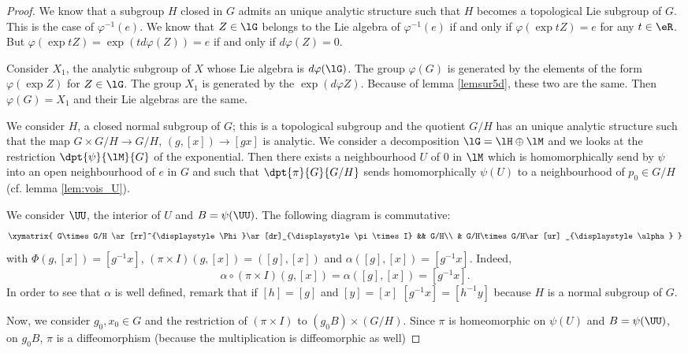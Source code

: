\begin{proof}
 We know that a subgroup $H$ closed in $G$ admits an unique analytic structure such that $H$ becomes a topological Lie subgroup of $G$. This is the case of $\varphi^{-1}(e)$. We know that $Z\in\lG$ belongs to the Lie algebra of $\varphi^{-1}(e)$ if and only if $\varphi(\exp tZ)=e$ for any $t\in\eR$. But $\varphi(\exp tZ)=\exp(td\varphi(Z))=e$ if and only if $d\varphi(Z)=0$.

Consider $X_1$, the analytic subgroup of $X$ whose Lie algebra is $d\varphi(\lG)$. The group $\varphi(G)$ is generated by the elements of the form $\varphi(\exp Z)$ for $Z\in\lG$. The group $X_1$ is generated by the $\exp(d\varphi Z)$. Because of lemma \ref{lemsur5d}, these two are the same. Then $\varphi(G)=X_1$ and their Lie algebras are the same.

We consider $H$, a closed normal subgroup of $G$; this is a topological subgroup and the quotient $G/H$ has an unique analytic structure such that the map $G\times G/H\to G/H$, $(g,[x])\to [gx]$ is analytic. We consider a decomposition $\lG=\lH\oplus\lM$ and we looks at the restriction $\dpt{\psi}{\lM}{G}$ of the exponential. Then there exists a neighbourhood $U$ of $0$ in $\lM$ which is homomorphically send by  $\psi$ into an open neighbourhood of $e$ in $G$ and such that $\dpt{\pi}{G}{G/H}$ sends homomorphically $\psi(U)$ to a neighbourhood  of $p_0\in G/H$ (cf. lemma \ref{lem:vois_U}).

We consider $\UU$, the interior of $U$ and $B=\psi(\UU)$. The following diagram is commutative:
\begin{equation}
 \xymatrix{
    G\times G/H  \ar[rr]^{\displaystyle\Phi}\ar[dr]_{\displaystyle \pi\times I} &&  G/H\\
     &     G/H\times G/H\ar[ur] _{\displaystyle\alpha}
  }
\end{equation}
with $\Phi(g,[x])=[g^{-1} x]$, $(\pi\times I)(g,[x])=([g],[x])$ and $\alpha([g],[x])=[g^{-1} x]$. Indeed, 
\[
   \alpha\circ(\pi\times I)(g,[x])=\alpha([g],[x])=[g^{-1} x].
\]
In order to see that $\alpha$ is well defined, remark that if $[h]=[g]$ and $[y]=[x]$ $[g^{-1} x]=[h^{-1} y]$ because $H$ is a normal subgroup of $G$.

Now, we consider $g_0,x_0\in G$ and the restriction of $(\pi\times I)$ to $(g_0B)\times(G/H)$. Since $\pi$ is homeomorphic on $\psi(U)$ and $B=\psi(\UU)$, on $g_0B$, $\pi$ is a diffeomorphism (because the multiplication is diffeomorphic as well)


\end{proof}
